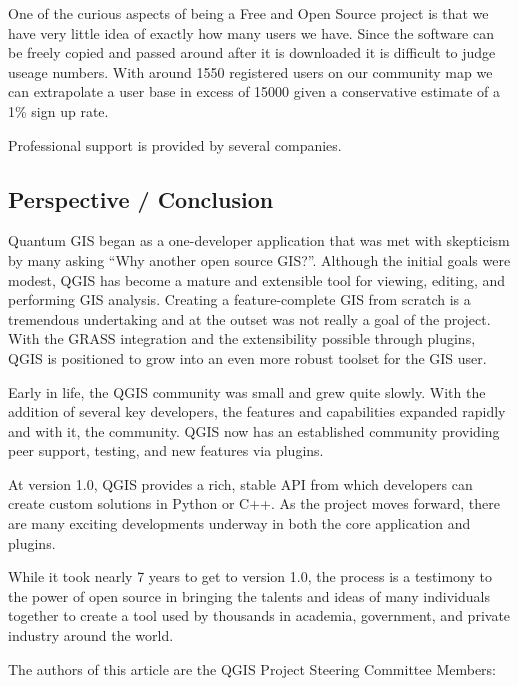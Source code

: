 One of the curious aspects of being a Free and Open Source project is that we 
have very little idea of exactly how many users we have. Since the software can 
be freely copied and passed around after it is downloaded it is difficult to 
judge useage numbers. With around 1550 registered users on our community map 
we can extrapolate a user base in excess of 15000 given a conservative 
estimate of a 1\% sign up rate.

Professional support is provided by several companies.

\subsection{Perspective / Conclusion}

Quantum GIS began as a one-developer application that was met with skepticism
by many asking ``Why another open source GIS?''. Although the initial goals
were modest, QGIS has become a mature and extensible tool for viewing,
editing, and performing GIS analysis. Creating a feature-complete GIS from
scratch is a tremendous undertaking and at the outset was not really a goal of
the project. With the GRASS integration and the extensibility possible through
plugins, QGIS is positioned to grow into an even more robust toolset for the
GIS user. 

Early in life, the QGIS community was small and grew quite slowly.
With the addition of several key developers, the features and capabilities
expanded rapidly and with it, the community. QGIS now has an established
community providing peer support, testing, and new features via plugins. 

At version 1.0, QGIS provides a rich, stable API from which developers can
create custom solutions in Python or C++. As the project moves forward, 
there are many exciting developments underway in both the core application and
plugins. 

While it took nearly 7 years to get to version 1.0, the process is a
testimony to the power of open source in bringing the talents and ideas of
many individuals together to create a tool used by thousands in academia,
government, and private industry around the world.


The authors of this article are the QGIS Project Steering Committee Members:


